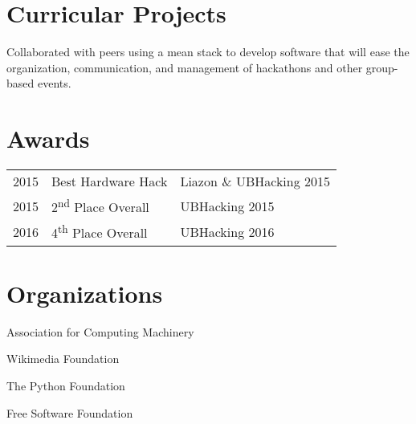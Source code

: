 \documentclass[]{deedy-resume-openfont}
\begin{document}
\begin{minipage}[t]{0.66\textwidth}

\section{Curricular Projects}
\begin{tightemize}
\item Collaborated with peers using a mean stack to develop software that will ease the organization, communication, and management of hackathons and other group-based events.
\end{tightemize}
\sectionsep


\section{Awards}
\begin{tabular}{rll}
2015	 & Best Hardware Hack  & Liazon \& UBHacking 2015\\
2015	 & 2\textsuperscript{nd} Place Overall  & UBHacking 2015\\
2016	 & 4\textsuperscript{th} Place Overall  & UBHacking 2016\\
\end{tabular}
\sectionsep


\section{Organizations}
\vspace{\topsep} %
\begin{tightemize}
\item Association for Computing Machinery\item Wikimedia Foundation\item The Python Foundation \item Free Software Foundation \end{tightemize}
\sectionsep

\end{minipage}
\end{document}
